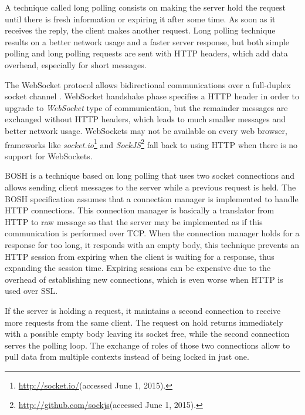 A technique called long polling consists on making the server hold the request until there is fresh information or expiring it after some time.
As soon as it receives the reply, the client makes another request. Long polling technique results on a better network usage and a faster server response, but both simple polling and long polling requests are sent with \ac{HTTP} headers, which add data overhead, especially for short messages.

The WebSocket protocol allows bidirectional communications over a full-duplex socket channel \cite{rfc6455}.
WebSocket handshake phase specifies a \ac{HTTP} header in order to upgrade to \emph{WebSocket} type of communication, but the remainder messages are exchanged without \ac{HTTP} headers, which leads to much smaller messages and better network usage. WebSockets may not be available on every web browser, frameworks like \emph{socket.io}\footnote{\url{http://socket.io/}(accessed June 1, 2015).} and \emph{SockJS}\footnote{\url{http://github.com/sockjs}(accessed June 1, 2015).} fall back to using \ac{HTTP} when there is no support for WebSockets. 

  \ac{BOSH}\cite{xep0124} is a technique based on long polling that uses two socket connections and allows sending client messages to the server while a previous request is held.
  The \ac{BOSH} specification assumes that a connection manager is implemented to handle \ac{HTTP} connections. This connection manager is basically a translator from \ac{HTTP} to raw message so that the server may be implemented as if this communication is performed over \ac{TCP}.
  When the connection manager holds for a response for too long, it responds with an empty body, this technique prevents an \ac{HTTP} session from expiring when the client is waiting for a response, thus expanding the session time. Expiring sessions can be expensive due to the overhead of establishing new connections, which is even worse when \ac{HTTP} is used over \ac{SSL}.

  If the server is holding a request, it maintains a second connection to receive more requests from the same client. The request on hold returns immediately with a possible empty body leaving its socket free, while the second connection serves the polling loop. The exchange of roles of those two connections allow to pull data from multiple contexts instead of being locked in just one.

